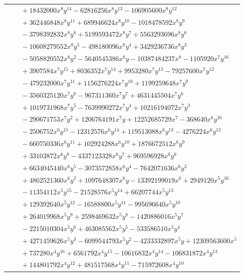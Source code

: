 \documentclass[11pt]{article}
\begin{document}
\begin{longtable}{@{}ll@{}}
 & $\quad +18432000x^{8}y^{14}-62816256x^{8}y^{13}-106905600x^{8}y^{12}$\\
 & $\quad +362446848x^{8}y^{11}+689946624x^{8}y^{10}-1018478592x^{8}y^{9}$\\
 & $\quad -3798392832x^{8}y^{8}+5199593472x^{8}y^{7}+5563293696x^{8}y^{6}$\\
 & $\quad -10608279552x^{8}y^{5}-498180096x^{8}y^{4}+3429236736x^{8}y^{3}$\\
 & $\quad -5058820552x^{8}y^{2}-5640545386x^{8}y-10387484237x^{8}-1105920x^{7}y^{16}$\\
 & $\quad +3907584x^{7}y^{15}+8036352x^{7}y^{14}+9953280x^{7}y^{13}-79257600x^{7}y^{12}$\\
 & $\quad -479232000x^{7}y^{11}+1156276224x^{7}y^{10}+1199259648x^{7}y^{9}$\\
 & $\quad -3560325120x^{7}y^{8}-967311360x^{7}y^{7}+4631445504x^{7}y^{6}$\\
 & $\quad +1019731968x^{7}y^{5}-7639990272x^{7}y^{4}+10216194072x^{7}y^{3}$\\
 & $\quad -290671753x^{7}y^{2}+1206764191x^{7}y+12252685729x^{7}-368640x^{6}y^{16}$\\
 & $\quad -2506752x^{6}y^{15}-12312576x^{6}y^{14}+119513088x^{6}y^{13}-4276224x^{6}y^{12}$\\
 & $\quad -660750336x^{6}y^{11}+102924288x^{6}y^{10}+1876672512x^{6}y^{9}$\\
 & $\quad +33103872x^{6}y^{8}-4337123328x^{6}y^{7}+969596928x^{6}y^{6}$\\
 & $\quad +6634045440x^{6}y^{5}-3073572858x^{6}y^{4}-7642071636x^{6}y^{3}$\\
 & $\quad +4862521360x^{6}y^{2}+1097648307x^{6}y-13392199019x^{6}+2949120x^{5}y^{16}$\\
 & $\quad -11354112x^{5}y^{15}-21528576x^{5}y^{14}+66207744x^{5}y^{13}$\\
 & $\quad +129392640x^{5}y^{12}-16588800x^{5}y^{11}-995696640x^{5}y^{10}$\\
 & $\quad +264019968x^{5}y^{9}+2598469632x^{5}y^{8}-1420886016x^{5}y^{7}$\\
 & $\quad -2215010304x^{5}y^{6}+463085562x^{5}y^{5}-533586510x^{5}y^{4}$\\
 & $\quad +4271459626x^{5}y^{3}-6099544793x^{5}y^{2}-4233332897x^{5}y+12309563600x^{5}$\\
 & $\quad +737280x^{4}y^{16}+6561792x^{4}y^{15}-10616832x^{4}y^{14}-106831872x^{4}y^{13}$\\
 & $\quad +144801792x^{4}y^{12}+481517568x^{4}y^{11}-715972608x^{4}y^{10}$\\

\end{longtable}
\end{document}
